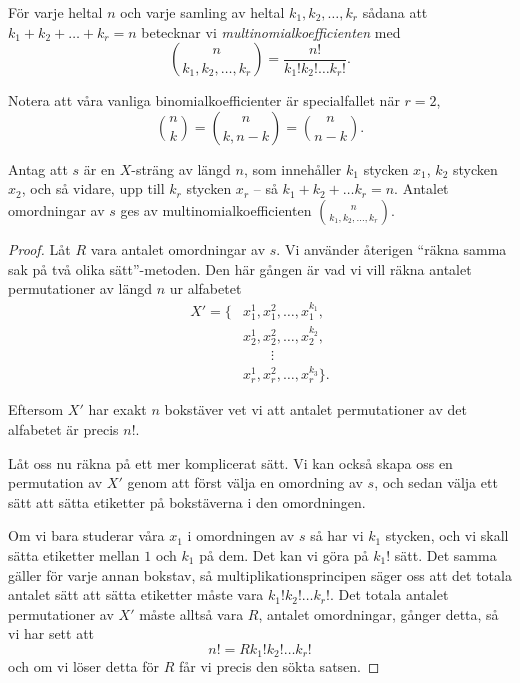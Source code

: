 \documentclass[nobib]{tufte-handout}
\begin{document}
\begin{definition}
  För varje heltal $n$ och varje samling av heltal $k_1, k_2, \ldots, k_r$ sådana att $k_1 + k_2 + \ldots + k_r = n$ betecknar vi \emph{multinomialkoefficienten} med
  $$\binom{n}{k_1, k_2, \ldots, k_r} = \frac{n!}{k_1!k_2!\ldots k_r!}.$$

  Notera att våra vanliga binomialkoefficienter är specialfallet när $r=2$,
  $$\binom{n}{k} = \binom{n}{k, n-k} = \binom{n}{n-k}.$$
\end{definition}

\begin{proposition}
  Antag att $s$ är en $X$-sträng av längd $n$, som innehåller $k_1$ stycken $x_1$, $k_2$ stycken $x_2$, och så vidare, upp till $k_r$ stycken $x_r$ -- så $k_1 + k_2 + \ldots k_r = n$. Antalet omordningar av $s$ ges av multinomialkoefficienten $\binom{n}{k_1, k_2, \ldots, k_r}$.

  \begin{proof}
    Låt $R$ vara antalet omordningar av $s$. Vi använder återigen ``räkna samma sak på två olika sätt''-metoden. Den här gången är vad vi vill räkna antalet permutationer av längd $n$ ur alfabetet
    \begin{align*}
      X' = \{&x_1^1, x_1^2, \ldots, x_1^{k_1},\\
             &x_2^1, x_2^2, \ldots, x_2^{k_2},\\
             &\qquad\vdots\\
             &x_r^1, x_r^2, \ldots, x_r^{k_3}\}.
    \end{align*}

    Eftersom $X'$ har exakt $n$ bokstäver vet vi att antalet permutationer av det alfabetet är precis $n!$.

    Låt oss nu räkna på ett mer komplicerat sätt. Vi kan också skapa oss en permutation av $X'$ genom att först välja en omordning av $s$, och sedan välja ett sätt att sätta etiketter på bokstäverna i den omordningen.

    Om vi bara studerar våra $x_1$ i omordningen av $s$ så har vi $k_1$ stycken, och vi skall sätta etiketter mellan $1$ och $k_1$ på dem. Det kan vi göra på $k_1!$ sätt. Det samma gäller för varje annan bokstav, så multiplikationsprincipen säger oss att det totala antalet sätt att sätta etiketter måste vara $k_1!k_2!\ldots k_r!$. Det totala antalet permutationer av $X'$ måste alltså vara $R$, antalet omordningar, gånger detta, så vi har sett att 
    $$n! = Rk_1!k_2!\ldots k_r!$$
    och om vi löser detta för $R$ får vi precis den sökta satsen.
  \end{proof}
\end{proposition}
\end{document}
